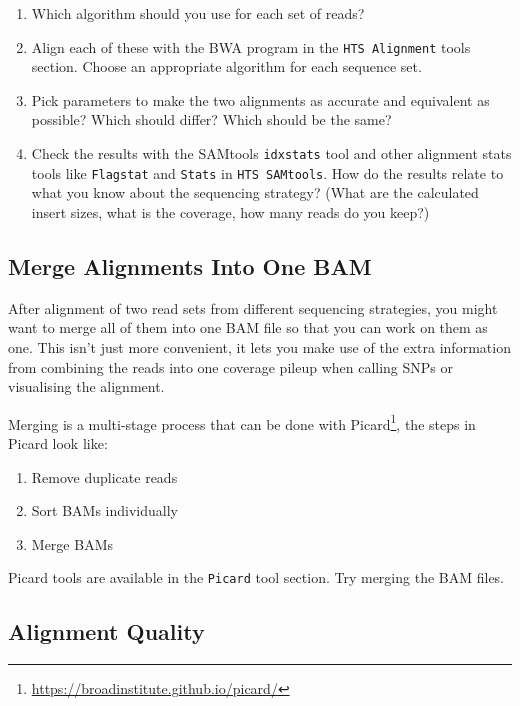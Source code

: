 \documentclass[12pt,]{book}
\providecommand{\tightlist}{%
  \setlength{\itemsep}{0pt}\setlength{\parskip}{0pt}}
\let\rmarkdownfootnote\footnote%
\def\footnote{\protect\rmarkdownfootnote}
\renewcommand{\href}[2]{#2\footnote{\url{#1}}}
\begin{document}
\begin{enumerate}
\def\labelenumi{\arabic{enumi}.}
\tightlist
\item
  Which algorithm should you use for each set of reads?
\item
  Align each of these with the BWA program in the
  \texttt{HTS\ Alignment} tools section. Choose an appropriate algorithm
  for each sequence set.
\item
  Pick parameters to make the two alignments as accurate and equivalent
  as possible? Which should differ? Which should be the same?
\item
  Check the results with the SAMtools \texttt{idxstats} tool and other
  alignment stats tools like \texttt{Flagstat} and \texttt{Stats} in
  \texttt{HTS\ SAMtools}. How do the results relate to what you know
  about the sequencing strategy? (What are the calculated insert sizes,
  what is the coverage, how many reads do you keep?)
\end{enumerate}

\subsection{Merge Alignments Into One
BAM}\label{merge-alignments-into-one-bam}

After alignment of two read sets from different sequencing strategies,
you might want to merge all of them into one BAM file so that you can
work on them as one. This isn't just more convenient, it lets you make
use of the extra information from combining the reads into one coverage
pileup when calling SNPs or visualising the alignment.

Merging is a multi-stage process that can be done with
\href{https://broadinstitute.github.io/picard/}{Picard}, the steps in
Picard look like:

\begin{enumerate}
\def\labelenumi{\arabic{enumi}.}
\tightlist
\item
  Remove duplicate reads
\item
  Sort BAMs individually
\item
  Merge BAMs
\end{enumerate}

Picard tools are available in the \texttt{Picard} tool section. Try
merging the BAM files.

\subsection{Alignment Quality}\label{alignment-quality}
\end{document}

